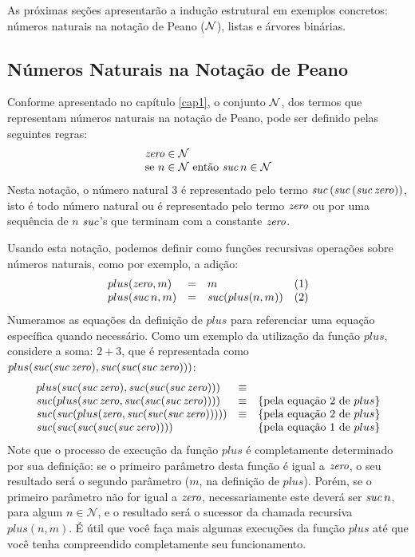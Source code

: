 As próximas seções apresentarão a indução estrutural em exemplos
concretos: números naturais na notação de Peano ($\mathcal{N}$), listas e
árvores binárias.

\subsection{Números Naturais na Notação de Peano}


Conforme apresentado no capítulo \ref{cap1}, o conjunto $\mathcal{N}$, dos
termos que representam números naturais na notação de Peano, pode ser definido pelas seguintes regras:
\[
   \begin{array}{l}
     \textit{zero\/} \in \mathcal{N}\\
     \text{se $n \in \mathcal{N}$ ent\~ao $\textit{suc\/}\, n\in\mathcal{N}$}
   \end{array}
\]
Nesta notação, o número natural $3$ é representado pelo termo
$\textit{suc\/}\,(\textit{suc\/}\,(\textit{suc\/}\,\textit{zero\/}))$, isto é todo número natural ou é
representado pelo termo $\textit{zero\/}$ ou por uma sequência de $n$ $\textit{suc\/}$'s
que terminam com a constante $\textit{zero\/}$.

Usando esta notação, podemos definir como funções recursivas operações
sobre números naturais, como por exemplo, a adição:
\[
\begin{array}{lclc}
plus(\textit{zero\/},m) & = & m & (1)\\
plus(\textit{suc\/}\,n,m) & = & \textit{suc\/} (plus(n,m)) & (2)
\end{array}
\]
Numeramos as equações da definição de $plus$ para referenciar uma
equação específica quando necessário.
Como um exemplo da utilização da função $plus$, considere a soma: $2 + 3$, que é
representada como $plus(\textit{suc\/}(\textit{suc\/}\,\textit{zero\/}),\textit{suc\/}(\textit{suc\/}(\textit{suc\/}\,\textit{zero\/})))$:
\[
\begin{array}{lcl}
plus(\textit{suc\/}(\textit{suc\/}\,\textit{zero\/}),\textit{suc\/}(\textit{suc\/}(\textit{suc\/}\,\textit{zero\/}))) & \equiv \\
\textit{suc\/}(plus(\textit{suc\/}\,\textit{zero\/},\textit{suc\/}(\textit{suc\/}(\textit{suc\/}\,\textit{zero\/})))) & \equiv &
\{\text{pela equação $2$ de $plus$}\}\\
\textit{suc\/}(\textit{suc\/}(plus(\textit{zero\/},\textit{suc\/}(\textit{suc\/}(\textit{suc\/}\,\textit{zero\/}))))) & \equiv &
\{\text{pela equação $2$ de $plus$}\}\\
\textit{suc\/}(\textit{suc\/}(\textit{suc\/}(\textit{suc\/}(\textit{suc\/}\,\textit{zero\/})))) & & \{\text{pela equação $1$ de $plus$}\}
\end{array}
\]
Note que o processo de execução da função $plus$ é completamente
determinado por sua definição: se o primeiro parâmetro desta função é
igual a $\textit{zero\/}$, o seu resultado será o segundo parâmetro ($m$, na
definição de $plus$). Porém, se o primeiro parâmetro não for igual a
$\textit{zero\/}$, necessariamente este deverá ser $\textit{suc\/}\,n$, para algum
$n\in\mathcal{N}$, e o resultado será o sucessor da chamada recursiva
$plus(n,m)$. É útil que você faça mais algumas execuções da função
$plus$ até que você tenha compreendido completamente seu
funcionamento.

